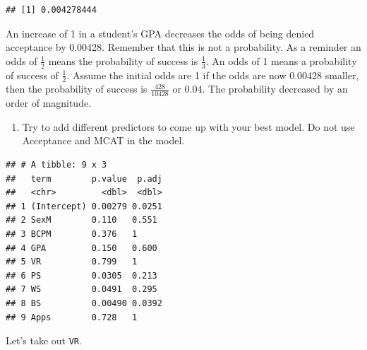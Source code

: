 \documentclass[
]{book}
\newenvironment{Shaded}{\begin{snugshade}}{\end{snugshade}}
\newcommand{\DataTypeTok}[1]{\textcolor[rgb]{0.13,0.29,0.53}{#1}}
\newcommand{\KeywordTok}[1]{\textcolor[rgb]{0.13,0.29,0.53}{\textbf{#1}}}
\newcommand{\NormalTok}[1]{#1}
\newcommand{\OperatorTok}[1]{\textcolor[rgb]{0.81,0.36,0.00}{\textbf{#1}}}
\newcommand{\StringTok}[1]{\textcolor[rgb]{0.31,0.60,0.02}{#1}}
\providecommand{\tightlist}{%
  \setlength{\itemsep}{0pt}\setlength{\parskip}{0pt}}
\begin{document}
\begin{verbatim}
## [1] 0.004278444
\end{verbatim}

An increase of 1 in a student's GPA decreases the odds of being denied acceptance by 0.00428. Remember that this is not a probability. As a reminder an odds of \(\frac{1}{2}\) means the probability of success is \(\frac{1}{3}\). An odds of 1 means a probability of success of \(\frac{1}{2}\). Assume the initial odds are 1 if the odds are now 0.00428 smaller, then the probability of success is \(\frac{428}{10428}\) or 0.04. The probability decreased by an order of magnitude.

\begin{enumerate}
\def\labelenumi{\alph{enumi}.}
\setcounter{enumi}{4}
\tightlist
\item
  Try to add different predictors to come up with your best model. Do not use Acceptance and MCAT in the model.
\end{enumerate}

\begin{Shaded}
\end{Shaded}

\begin{verbatim}
## # A tibble: 9 x 3
##   term        p.value  p.adj
##   <chr>         <dbl>  <dbl>
## 1 (Intercept) 0.00279 0.0251
## 2 SexM        0.110   0.551 
## 3 BCPM        0.376   1     
## 4 GPA         0.150   0.600 
## 5 VR          0.799   1     
## 6 PS          0.0305  0.213 
## 7 WS          0.0491  0.295 
## 8 BS          0.00490 0.0392
## 9 Apps        0.728   1
\end{verbatim}

Let's take out \texttt{VR}.

\begin{Shaded}
\end{Shaded}
\end{document}
